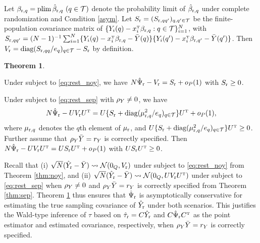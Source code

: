 \documentclass[11pt]{article}
\theoremstyle{definition}
\newtheorem{theorem}{Theorem}
\begin{document}
Let $\brq = \plim \hbrq \ (q\in \mt)$ denote the probability limit of $\hbrq$ under complete randomization and Condition \ref{asym}. 
Let $S_{\lr } = (S_{\lr ,qq'})_{q,q'\in\mt}$ be the finite-population covariance matrix of  $\{Y_i(q) - x_i^\T \brq : q\in \mt\}_{i=1}^N$, with  $S_{\lr,qq'} = (N-1)^{-1}\sumi \{Y_i(q) - x_i^\T \brq - \by(q) \}\{Y_i(q') - x_i^\T \beta_{\lr,q'} - \by(q')\}$.  
Then $\vrr = \diag(S_{\rr,qq}/e_q)_\qit - S_\rr$ by definition.



\begin{theorem}\label{thm:ehw_rr}
{\precre}
\begine[(i)]
\item\label{item:ehw_noy} Under \rlss subject to \eqref{eq:rest_noy}, we have $N \hsr - \vlr = S_{\lr } + \op$  with $S_\lr \geq 0$.
\item Under \rlss subject to \eqref{eq:rest_sep} with $\rhy \neq 0$, 
we have $$N\hsr - U\vlr U^\T =  U \{S_{\lr } + \diag(\murq^2 /e_q)_{\qit} \} U^\T + \op,$$
where $\murq$ denotes the $q$th element of $\mur$, and $U  \{S_{\lr } + \diag(\murq^2 /e_q)_{\qit}\} U^\T \geq 0$. 
Further assume that $\rhy \by = r_Y$ is correctly specified. Then  $N\hsr - U\vlr U^\T =  US_{\lr }U^\T  + \op$ with $US_{\lr }U^\T \geq 0$.

\ende
\end{theorem}

Recall that (i) $\sqrtn (\hyr  - \by )  \rs \mn(0_Q, \vlr)$ under \rlss subject to \eqref{eq:rest_noy}  from Theorem \ref{thm:noy}, and (ii) $\sqrt N(\hyr  - \by) \rs \mathcal N(0_Q, U \vlr  U^\T)$ under \rlss subject to \eqref{eq:rest_sep} when $\rhy \neq 0$ and $\rhy\by = r_Y$ is correctly specified from Theorem \ref{thm:sep}. Theorem \ref{thm:ehw_rr} thus ensures that $\hsr$ is asymptotically conservative for estimating the true sampling covariance of $\hyr $ under both scenarios. 
This justifies the Wald-type inference of $\tau$ based on $\htlr = C\hyr$ and $C \hsr C^\T$ as the point estimator and estimated covariance, respectively, when $\rhy\by = r_Y$ is correctly specified. 
\end{document}
